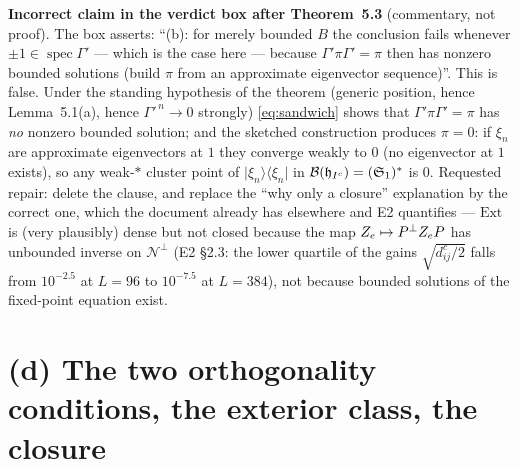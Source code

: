 \documentclass[11pt]{article}
\newcommand{\Ext}{\mathrm{Ext}}\newcommand{\Nvis}{\mathcal N}
\begin{document}
\begin{verdictgap}
\textbf{Incorrect claim in the verdict box after Theorem~5.3} (commentary, not proof).
The box asserts: ``(b): for merely bounded $B$ the conclusion fails whenever
$\pm1\in\operatorname{spec}\Gamma'$ --- which is the case here --- because
$\Gamma'\pi\Gamma'=\pi$ then has nonzero bounded solutions (build $\pi$ from an approximate
eigenvector sequence)''.  This is false.  Under the standing hypothesis of the theorem
(generic position, hence Lemma~5.1(a), hence $\Gamma'^{\,n}\to0$ strongly)
\eqref{eq:sandwich} shows that $\Gamma'\pi\Gamma'=\pi$ has \emph{no} nonzero bounded
solution; and the sketched construction produces $\pi=0$: if $\xi_n$ are approximate
eigenvectors at $1$ they converge weakly to $0$ (no eigenvector at $1$ exists), so any
weak-$*$ cluster point of $\lvert\xi_n\rangle\langle\xi_n\rvert$ in
$\mathcal B(\mathfrak h_{I^c})=(\mathfrak S_1)^*$ is $0$.  Requested repair: delete the clause, and
replace the ``why only a closure'' explanation by the correct one, which the document
already has elsewhere and E2 quantifies --- $\Ext$ is (very plausibly) dense but not
closed because the map $Z_e\mapsto P^{\perp} Z_eP$ has unbounded inverse on
$\Nvis^{\perp}$ (E2 \S2.3: the lower quartile of the gains $\sqrt{d^c_{ij}/2}$ falls from
$10^{-2.5}$ at $L=96$ to $10^{-7.5}$ at $L=384$), not because bounded solutions of the
fixed-point equation exist.
\end{verdictgap}

\section{(d) The two orthogonality conditions, the exterior class, the closure}\label{sec:d}
\end{document}
